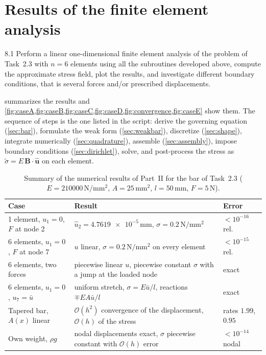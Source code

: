 \documentclass[11pt,a4paper]{article}
\numberwithin{equation}{section}
\theoremstyle{remark}
\newcommand{\bigO}[1]{\mathcal{O}\!\left(#1\right)}
\newcommand{\bB}{\bm{B}}
\newcommand{\buh}{\hat{\bm{u}}}
\begin{document}
\section{Results of the finite element analysis}\label{sec:results}

\begin{task}{8.1}
  Perform a linear one-dimensional finite element analysis of the problem of Task~2.3 with
  $n = 6$ elements using all the subroutines developed above, compute the approximate
  stress field, plot the results, and investigate different boundary conditions, that is
  several forces and/or prescribed displacements.
\end{task}

 summarizes the results and \cref{fig:caseA,fig:caseB,fig:caseC,fig:caseD,fig:convergence,fig:caseE}
show them. The sequence of steps is the one listed in the script: derive the governing equation
(\cref{sec:bar}), formulate the weak form (\cref{sec:weakbar}), discretize
(\cref{sec:shape}), integrate numerically (\cref{sec:quadrature}), assemble
(\cref{sec:assembly}), impose boundary conditions (\cref{sec:dirichlet}), solve, and
post-process the stress as $\tilde\sigma = E\,\bB\cdot\buh$ on each element.

\begin{table}[ht]
  \centering
  \caption{Summary of the numerical results of Part~II for the bar of Task~2.3
    ($E = \num{210000}\,\mathrm{N/mm^2}$, $A = 25\,\mathrm{mm^2}$, $l = 50\,\mathrm{mm}$,
    $F = 5\,\mathrm{N}$).}
  \label{tab:results}
  \begin{tabularx}{\linewidth}{lXl}
    \toprule
    Case & Result & Error \\
    \midrule
    1 element, $u_1 = 0$, $F$ at node 2
      & $\hat u_2 = \num{4.7619e-5}\,\mathrm{mm}$, $\sigma = 0.2\,\mathrm{N/mm^2}$
      & $<10^{-16}$ rel. \\
    6 elements, $u_1 = 0$, $F$ at node 7
      & $u$ linear, $\sigma = 0.2\,\mathrm{N/mm^2}$ on every element
      & $<10^{-15}$ rel. \\
    6 elements, two forces
      & piecewise linear $u$, piecewise constant $\sigma$ with a jump at the loaded node
      & exact \\
    6 elements, $u_1 = 0$, $u_7 = \bar u$
      & uniform stretch, $\sigma = E\bar u/l$, reactions $\mp EA\bar u/l$
      & exact \\
    Tapered bar, $A(x)$ linear
      & $\bigO{h^2}$ convergence of the displacement, $\bigO{h}$ of the stress
      & rates $1.99$, $0.95$ \\
    Own weight, $\rho g$
      & nodal displacements exact, $\sigma$ piecewise constant with $\bigO{h}$ error
      & $<10^{-14}$ nodal \\
    \bottomrule
  \end{tabularx}
\end{table}
\end{document}
